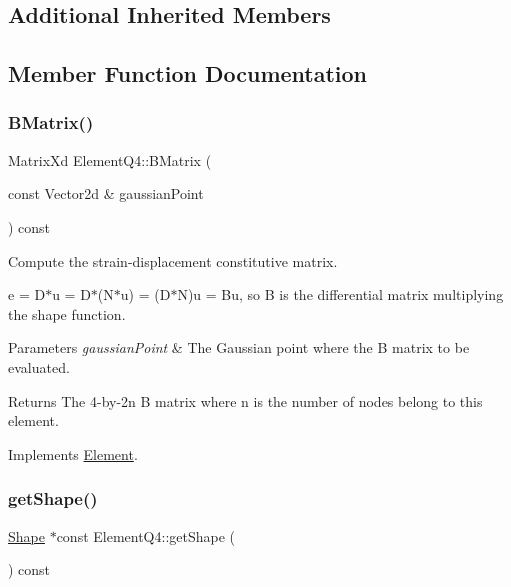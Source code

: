\subsection*{Additional Inherited Members}


\subsection{Member Function Documentation}
\mbox{\label{class_element_q4_a092a9584a1b3b22cd929246ba100f91a}} 
\subsubsection{\texorpdfstring{B\+Matrix()}{BMatrix()}}
{\footnotesize\ttfamily Matrix\+Xd Element\+Q4\+::\+B\+Matrix (\begin{DoxyParamCaption}\item[{const Vector2d \&}]{gaussian\+Point }\end{DoxyParamCaption}) const\hspace{0.3cm}{\ttfamily [virtual]}}



Compute the strain-\/displacement constitutive matrix. 

e = D$\ast$u = D$\ast$(N$\ast$u) = (D$\ast$N)u = Bu, so B is the differential matrix multiplying the shape function.


\begin{DoxyParams}{Parameters}
{\em gaussian\+Point} & The Gaussian point where the B matrix to be evaluated. \\
\hline
\end{DoxyParams}
\begin{DoxyReturn}{Returns}
The 4-\/by-\/2n B matrix where n is the number of nodes belong to this element. 
\end{DoxyReturn}


Implements \mbox{\hyperlink{class_element_ae3c88315d1a30addff6379a9089465ca}{Element}}.

\mbox{\label{class_element_q4_a3e2b762e838f20a10c184f55d3d4ff85}} 
\subsubsection{\texorpdfstring{get\+Shape()}{getShape()}}
{\footnotesize\ttfamily \mbox{\hyperlink{class_shape}{Shape}} $\ast$const Element\+Q4\+::get\+Shape (\begin{DoxyParamCaption}{ }\end{DoxyParamCaption}) const\hspace{0.3cm}{\ttfamily [virtual]}}



